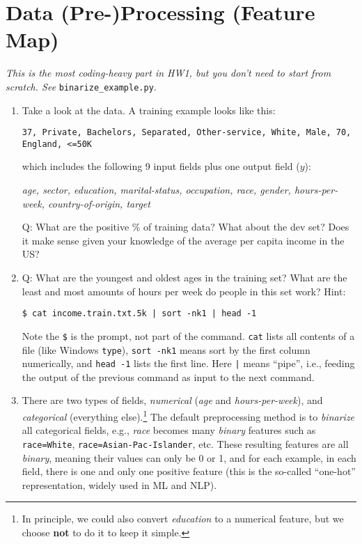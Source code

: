 \documentclass[11pt]{article}
\begin{document}
\section{Data (Pre-)Processing (Feature Map)}

{\it This is the most coding-heavy part in HW1, but you don't need to start from scratch. See} \verb|binarize_example.py|.

\begin{enumerate}

\item Take a look at the data. A training example looks like this:

\verb|37, Private, Bachelors, Separated, Other-service, White, Male, 70, England, <=50K|

which includes the following 9 input fields plus one output field ($y$):

{\it age, sector, education, marital-status, occupation, race, gender,  hours-per-week, country-of-origin, target}

Q: What are the positive \% of training data? What about the dev set? Does it make sense given your knowledge of the average per capita income in the US?

\item 
Q: What are the youngest and oldest ages in the training set?
What are the least and most amounts of hours per week do people in this set work?
Hint: 

{\tt \$ cat income.train.txt.5k | sort -nk1 | head -1}

Note the {\tt \$} is the prompt, not part of the command. {\tt cat} lists all contents of a file (like Windows {\tt type}), {\tt sort -nk1} means sort by the first column numerically, and {\tt head -1} lists the first line. Here {\tt |} means ``pipe'', i.e., feeding the output of the previous command as input to the next command.


\item
There are two types of fields, {\it numerical}  ({\it age} and {\it hours-per-week}), and {\it categorical} (everything else).\footnote{
  In principle, we could also convert {\it education} to a numerical feature,
  but we choose {\bf not} to do it to keep it simple.}
The default preprocessing method is to {\it binarize} all categorical fields,
e.g., %
{\it race} becomes  many {\it binary} features such as
\verb|race=White|, \verb|race=Asian-Pac-Islander|, etc.
These resulting features are all {\em binary}, meaning 
their values can only be 0 or 1, and for each example,
in each field, there is one and only one positive feature
(this is the so-called ``one-hot'' representation,
widely used in ML and NLP).


\end{enumerate}
\end{document}
